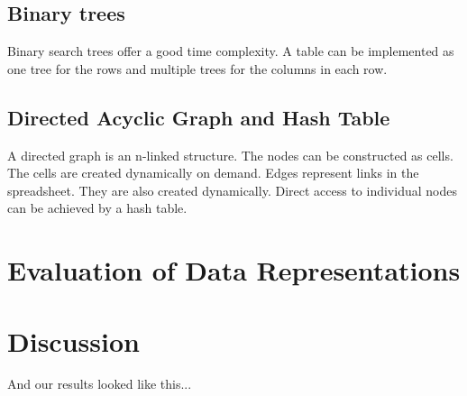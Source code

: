 \documentclass[a4paper,11pt,twoside]{article}
\begin{document}
\subsection{Binary trees}
Binary search trees offer a good time complexity. A table can be
implemented as one tree for the rows and multiple trees for the
columns in each row. 

\subsection{Directed Acyclic Graph and Hash Table}
A directed graph is an n-linked structure. The nodes can be
constructed as cells. The cells are created dynamically on demand. 
Edges represent links in the spreadsheet. They are also created 
dynamically. Direct access to individual nodes can be achieved by a hash
table. 

 

\section{Evaluation of Data Representations}


\section{Discussion}
And our results looked like this...



\end{document}

